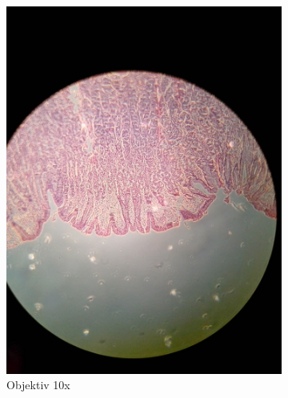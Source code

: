 \begin{figure}[h!]
\begin{subfigure}[b]{0.3\textwidth}
		\includegraphics[width=1\textwidth]{../images/02_stomach.jpg}
		\caption{Objektiv 10x}
		\label{fig:02_stomach}
	\end{subfigure}
	\begin{subfigure}[b]{0.3\textwidth}

\end{subfigure}
\end{figure}
